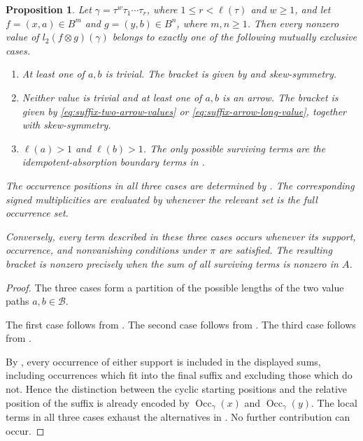 \documentclass[11pt,a4paper,reqno]{amsart}
\newcommand{\mB}{\mathcal B}
\newcommand{\Occ}{\operatorname{Occ}}
\newcommand{\para}[2]{(#1,#2)}
\theoremstyle{plain}
\newtheorem{proposition}[proposition]{Proposition}
\theoremstyle{definition}
\numberwithin{equation}{section}
\begin{document}
	\begin{proposition}
		\label{prop:higher-primitive-cycle-suffix}
		Let $\gamma=\tau^w\tau_1\cdots\tau_r$, where
		$1\leq r<\ell(\tau)$ and $w\geq1$, and let
		$f=\para{x}{a}\in B^m$ and $g=\para{y}{b}\in B^n$, where
		$m,n\geq1$.  Then every nonzero value of $l_2(f\otimes g)(\gamma)$ belongs to exactly one of the following mutually exclusive cases.
		
		\begin{enumerate}
			\item At least one of $a,b$ is trivial.  The bracket is given by
			and skew-symmetry.
			
			\item Neither value is trivial and at least one of $a,b$ is an
			arrow.  The bracket is given by
			\eqref{eq:suffix-two-arrow-values} or
			\eqref{eq:suffix-arrow-long-value}, together with skew-symmetry.
			
			\item $\ell(a)>1$ and $\ell(b)>1$.  The only possible surviving terms are the idempotent-absorption
			boundary terms in
			.
		\end{enumerate}
		
		The occurrence positions in all three cases are determined by
		.  The corresponding signed multiplicities
		are evaluated by  whenever the
		relevant set is the full occurrence set.
		
		Conversely, every term described in these three cases occurs whenever
		its support, occurrence, and nonvanishing conditions under $\pi$ are satisfied.  The
		resulting bracket is nonzero precisely when the sum of all surviving terms
		is nonzero in $A$.
	\end{proposition}
	
	\begin{proof}
		The three cases form a partition of the possible lengths of the two
		value paths $a,b\in\mB$.
		
		The first case follows from
		.  The second case follows from
		.  The third case
		follows from .
		
		By , every occurrence of either support is
		included in the displayed sums, including occurrences which fit into the
		final suffix and excluding those which do not.  Hence the distinction
		between the cyclic starting positions and the relative position of the
		suffix is already encoded by $\Occ_\gamma(x)$ and $\Occ_\gamma(y)$.
		The local terms in all three cases exhaust the alternatives
		in .  No further contribution can occur.
	\end{proof}
	
\end{document}
